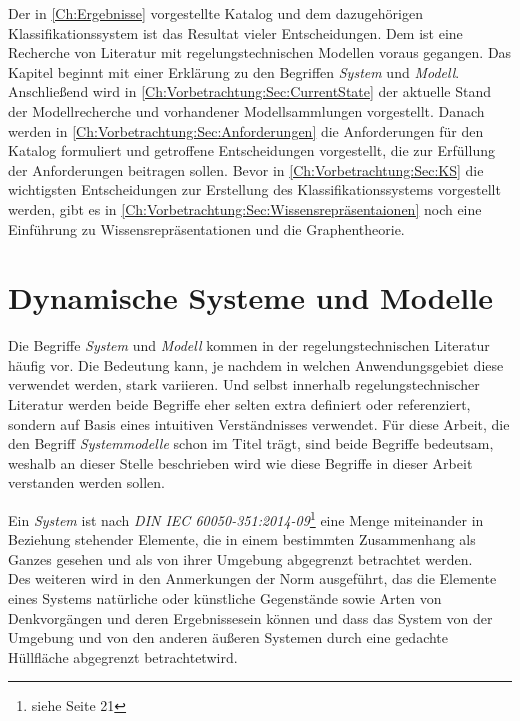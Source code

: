 Der in \ref{Ch:Ergebnisse} vorgestellte Katalog und dem dazugehörigen Klassifikationssystem ist das Resultat vieler Entscheidungen. Dem ist eine Recherche von Literatur mit regelungstechnischen Modellen voraus gegangen. Das Kapitel beginnt mit einer Erklärung zu den Begriffen \textit{System} und \textit{Modell}. Anschließend wird in \ref{Ch:Vorbetrachtung:Sec:CurrentState} der aktuelle Stand der Modellrecherche und vorhandener Modellsammlungen vorgestellt. Danach werden in \ref{Ch:Vorbetrachtung:Sec:Anforderungen} die Anforderungen für den Katalog formuliert und getroffene Entscheidungen vorgestellt, die zur Erfüllung der Anforderungen beitragen sollen. Bevor in \ref{Ch:Vorbetrachtung:Sec:KS} die wichtigsten Entscheidungen zur Erstellung des Klassifikationssystems vorgestellt werden, gibt es in \ref{Ch:Vorbetrachtung:Sec:Wissensrepräsentaionen} noch eine Einführung zu Wissensrepräsentationen und die Graphentheorie.   

\section{Dynamische Systeme und Modelle}
\label{Ch:Vorbetrachtung:Sec:SystemeModelle}
Die Begriffe \textit{System} und \textit{Modell} kommen in der regelungstechnischen Literatur häufig vor. Die Bedeutung kann, je nachdem in welchen Anwendungsgebiet diese verwendet werden, stark variieren. Und selbst innerhalb regelungstechnischer Literatur werden beide Begriffe eher selten extra definiert oder referenziert, sondern auf Basis eines intuitiven Verständnisses verwendet. Für diese Arbeit, die den Begriff \textit{Systemmodelle} schon im Titel trägt, sind beide Begriffe bedeutsam, weshalb an dieser Stelle beschrieben wird wie diese Begriffe in dieser Arbeit verstanden werden sollen.

Ein \textit{System} ist nach \textit{DIN IEC 60050-351:2014-09}\footnote{siehe \cite{DINIEC60050-351} Seite 21} eine \glqq Menge miteinander in Beziehung stehender Elemente, die in einem bestimmten Zusammenhang als Ganzes gesehen und als von ihrer Umgebung abgegrenzt betrachtet werden\grqq.\\
Des weiteren wird in den Anmerkungen der Norm ausgeführt, das die Elemente eines Systems \glqq natürliche oder künstliche Gegenstände sowie Arten von Denkvorgängen und deren Ergebnisse\grqq sein können und dass das System \glqq von der Umgebung und von den anderen äußeren Systemen durch eine gedachte Hüllfläche abgegrenzt betrachtet\grqq wird.

